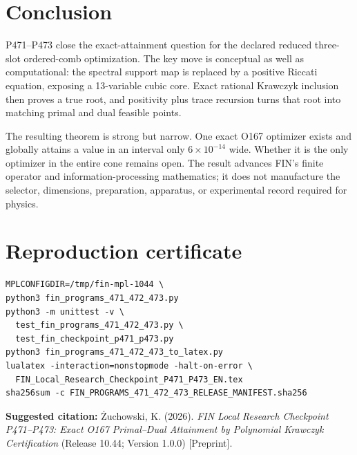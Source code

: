 \documentclass[11pt,a4paper,openany]{report}
\begin{document}
\chapter{Conclusion}

P471--P473 close the exact-attainment question for the declared reduced three-slot ordered-comb optimization. The key move is conceptual as well as computational: the spectral support map is replaced by a positive Riccati equation, exposing a 13-variable cubic core. Exact rational Krawczyk inclusion then proves a true root, and positivity plus trace recursion turns that root into matching primal and dual feasible points.

The resulting theorem is strong but narrow. One exact O167 optimizer exists and globally attains a value in an interval only \(6\times10^{-14}\) wide. Whether it is the only optimizer in the entire cone remains open. The result advances FIN's finite operator and information-processing mathematics; it does not manufacture the selector, dimensions, preparation, apparatus, or experimental record required for physics.


\clearpage\chapter*{Reproduction certificate}
\begin{Verbatim}[fontsize=\small]
MPLCONFIGDIR=/tmp/fin-mpl-1044 \
python3 fin_programs_471_472_473.py
python3 -m unittest -v \
  test_fin_programs_471_472_473.py \
  test_fin_checkpoint_p471_p473.py
python3 fin_programs_471_472_473_to_latex.py
lualatex -interaction=nonstopmode -halt-on-error \
  FIN_Local_Research_Checkpoint_P471_P473_EN.tex
sha256sum -c FIN_PROGRAMS_471_472_473_RELEASE_MANIFEST.sha256
\end{Verbatim}
\noindent\textbf{Suggested citation:}
\.Zuchowski, K. (2026). \emph{FIN Local Research Checkpoint P471--P473:
Exact O167 Primal--Dual Attainment by Polynomial Krawczyk Certification}
(Release 10.44; Version 1.0.0) [Preprint].
\end{document}
